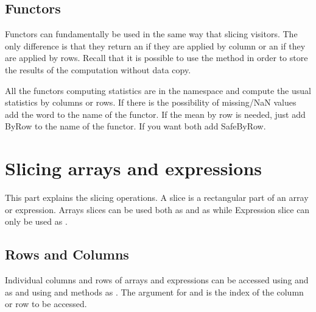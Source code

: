 \documentclass[a4paper,10pt]{article}
\begin{document}
\subsection{Functors}

Functors can fundamentally be used in the same way that slicing visitors. The
only difference is that they return an  if they are applied
by column or an  if they are applied by rows. Recall that it
is possible to use the  method in order to store the results of the
computation without data copy.

All the functors computing statistics are in the  namespace and
compute the usual statistics by columns or rows. If there is the possibility
of missing/NaN values add the word  to the name of the functor. If
the mean by row is needed, just add ByRow to the name of the functor. If you
want both add SafeByRow.

\begin{minipage}[t]{0.5\textwidth}

\end{minipage}
\hspace{0.2cm}
\begin{minipage}[t]{0.5\textwidth}
\addtocounter{lstlisting}{-1}

\end{minipage}




\section{Slicing arrays and expressions}

This part explains the slicing operations. A slice is a rectangular part of an
array or expression. Arrays slices can be used both as  and as 
while Expression slice can only be used as .

\subsection{Rows and Columns}

Individual columns and rows of arrays and expressions can be accessed using
 and  as 
and using  and  methods as
. The argument for  and  is the index
of the column or row to be accessed.
\end{document}
